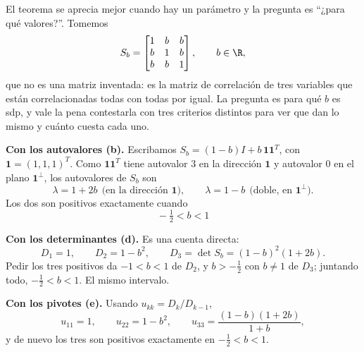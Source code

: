 \begin{example}\label{ej:equicorrelacion}
El teorema se aprecia mejor cuando hay un parámetro y la pregunta es ``¿para
qué valores?''. Tomemos
\[
S_b=\begin{bmatrix} 1 & b & b\\ b & 1 & b\\ b & b & 1\end{bmatrix} ,
\qquad b\in\R ,
\]
que no es una matriz inventada: es la matriz de correlación de tres variables
que están correlacionadas todas con todas por igual. La pregunta es para qué
$b$ es sdp, y vale la pena contestarla con tres criterios distintos para ver
que dan lo mismo y cuánto cuesta cada uno.

\medskip
\noindent\textbf{Con los autovalores (b).} Escribamos
$S_b=(1-b)I + b\,\mathbf 1\mathbf 1^T$, con $\mathbf 1=(1,1,1)^T$. Como
$\mathbf 1\mathbf 1^T$ tiene autovalor $3$ en la dirección $\mathbf 1$ y
autovalor $0$ en el plano $\mathbf 1^\perp$, los autovalores de $S_b$ son
\[
\lambda = 1+2b \ \ \text{(en la dirección } \mathbf 1),
\qquad
\lambda = 1-b \ \ \text{(doble, en } \mathbf 1^\perp).
\]
Los dos son positivos exactamente cuando
\[
\boxed{\ -\tfrac12 < b < 1\ }
\]

\medskip
\noindent\textbf{Con los determinantes (d).} Es una cuenta directa:
\[
D_1=1,\qquad D_2=1-b^2,\qquad D_3=\det S_b=(1-b)^2(1+2b) .
\]
Pedir los tres positivos da $-1<b<1$ de $D_2$, y $b>-\frac12$ con $b\neq1$ de
$D_3$; juntando todo, $-\frac12<b<1$. El mismo intervalo.

\medskip
\noindent\textbf{Con los pivotes (e).} Usando $u_{kk}=D_k/D_{k-1}$,
\[
u_{11}=1,\qquad u_{22}=1-b^2,\qquad u_{33}=\frac{(1-b)(1+2b)}{1+b} ,
\]
y de nuevo los tres son positivos exactamente en $-\frac12<b<1$.


\end{example}
